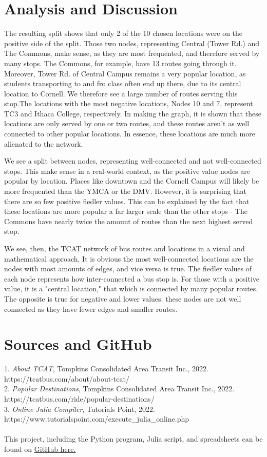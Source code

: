 \documentclass{article}
\begin{document}
\section{Analysis and Discussion}
The resulting split shows that only 2 of the 10 chosen locations were on the positive side of the split. Those two nodes, representing Central (Tower Rd.) and The Commons, make sense, as they are most frequented, and therefore served by many stops. The Commons, for example, have 13 routes going through it. Moreover, Tower Rd. of Central Campus remains a very popular location, as students transporting to and fro class often end up there, due to its central location to Cornell. We therefore see a large number of routes serving this stop.The locations with the most negative locations, Nodes 10 and 7, represent TC3 and Ithaca College, respectively. In making the graph, it is shown that these locations are only served by one or two routes, and these routes aren't as well connected to other popular locations. In essence, these locations are much more alienated to the network. 

We see a split between nodes, representing well-connected and not well-connected stops. This make sense in a real-world context, as the positive value nodes are popular by location. Places like downtown and the Cornell Campus will likely be more frequented than the YMCA or the DMV. However, it is surprising that there are so few positive fiedler values. This can be explained by the fact that these locations are more popular a far larger scale than the other stops - The Commons have nearly twice the amount of routes than the next highest served stop.

We see, then, the TCAT network of bus routes and locations in a visual and mathematical approach. It is obvious the most well-connected locations are the nodes with most amounts of edges, and vice versa is true. The fiedler values of each node represents how inter-connected a bus stop is. For those with a positive value, it is a "central location," that which is connected by many popular routes. The opposite is true for negative and lower values: these nodes are not well connected as they have fewer edges and smaller routes.

\section{Sources and GitHub}
1. \emph{About TCAT}, Tompkins Consolidated Area Transit Inc., 2022. https://tcatbus.com/about/about-tcat/\\
2. \emph{Popular Destinations}, Tompkins Consolidated Area Transit Inc., 2022. https://tcatbus.com/ride/popular-destinations/ \\
3. \emph{Online Julia Compiler}, Tutorials Point, 2022. https://www.tutorialspoint.com/execute\_julia\_online.php
\\ \\
This project, including the Python program, Julia script, and spreadsheets can be found on \href{https://github.com/Ming-DeMers/TCAT-Network-and-Fiedler-Set-Project}{GitHub here.} 
\end{document}
